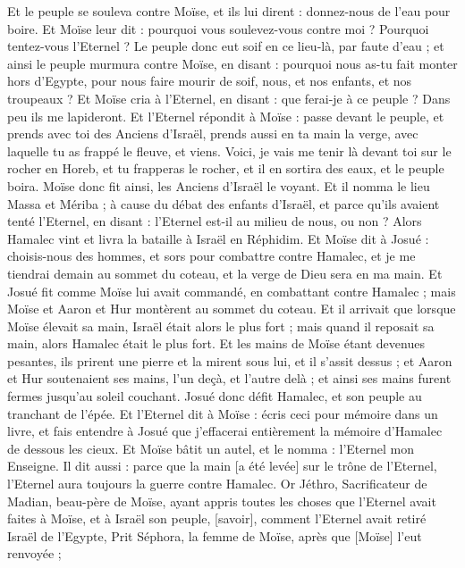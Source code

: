 \begin{multicols}{2}
Et le peuple se souleva contre Moïse, et ils lui dirent : donnez-nous de l'eau pour boire. Et Moïse leur dit : pourquoi vous soulevez-vous contre moi ? Pourquoi tentez-vous l'Eternel ?
Le peuple donc eut soif en ce lieu-là, par faute d'eau ; et ainsi le peuple murmura contre Moïse, en disant : pourquoi nous as-tu fait monter hors d'Egypte, pour nous faire mourir de soif, nous, et nos enfants, et nos troupeaux ?
Et Moïse cria à l'Eternel, en disant : que ferai-je à ce peuple ? Dans peu ils me lapideront.
Et l'Eternel répondit à Moïse : passe devant le peuple, et prends avec toi des Anciens d'Israël, prends aussi en ta main la verge, avec laquelle tu as frappé le fleuve, et viens.
Voici, je vais me tenir là devant toi sur le rocher en Horeb, et tu frapperas le rocher, et il en sortira des eaux, et le peuple boira. Moïse donc fit ainsi, les Anciens d'Israël le voyant.
Et il nomma le lieu Massa et Mériba ; à cause du débat des enfants d'Israël, et parce qu'ils avaient tenté l'Eternel, en disant : l'Eternel est-il au milieu de nous, ou non ?
Alors Hamalec vint et livra la bataille à Israël en Réphidim.
Et Moïse dit à Josué : choisis-nous des hommes, et sors pour combattre contre Hamalec, et je me tiendrai demain au sommet du coteau, et la verge de Dieu sera en ma main.
Et Josué fit comme Moïse lui avait commandé, en combattant contre Hamalec ; mais Moïse et Aaron et Hur montèrent au sommet du coteau.
Et il arrivait que lorsque Moïse élevait sa main, Israël était alors le plus fort ; mais quand il reposait sa main, alors Hamalec était le plus fort.
Et les mains de Moïse étant devenues pesantes, ils prirent une pierre et la mirent sous lui, et il s'assit dessus ; et Aaron et Hur soutenaient ses mains, l'un deçà, et l'autre delà ; et ainsi ses mains furent fermes jusqu'au soleil couchant.
Josué donc défit Hamalec, et son peuple au tranchant de l'épée.
Et l'Eternel dit à Moïse : écris ceci pour mémoire dans un livre, et fais entendre à Josué que j'effacerai entièrement la mémoire d'Hamalec de dessous les cieux.
Et Moïse bâtit un autel, et le nomma : l'Eternel mon Enseigne.
Il dit aussi : parce que la main [a été levée] sur le trône de l'Eternel, l'Eternel aura toujours la guerre contre Hamalec.
\VerseOne{}Or Jéthro, Sacrificateur de Madian, beau-père de Moïse, ayant appris toutes les choses que l'Eternel avait faites à Moïse, et à Israël son peuple, [savoir], comment l'Eternel avait retiré Israël de l'Egypte,
Prit Séphora, la femme de Moïse, après que [Moïse] l'eut renvoyée ;

\end{multicols}
